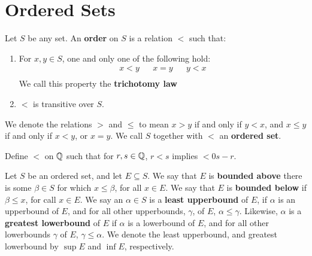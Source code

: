 
\section{Ordered Sets}

\begin{definition}
    Let $S$ be any set. An \textbf{order} on $S$ is a relation  $<$ such that:
        \begin{enumerate}[label=(\arabic*)]
            \item For $x,y \in S$, one and only one of the following hold:
                \begin{align*}
                    x<y && x=y && y<x \\		
                \end{align*}
            We call this property the \textbf{trichotomy law}

            \item $<$ is transitive over $S$.
        \end{enumerate}
    We denote the relations $>$ and $\leq$ to mean $x>y$ if and only if $y<x$, 
    and $x \leq y$ if and only if $x<y$, or $x=y$. We call $S$ together with  $<$ 
    an \textbf{ordered set}.
\end{definition}

\begin{example}
    Define $<$  on $\mathbb{Q}$ such that for $r,s \in \mathbb{Q}$, $r<s$ implies $<0s-r$.		
\end{example}

\begin{definition}
    Let $S$ be an ordered set, and let  $E \subseteq S$. We say that  $E$ is \textbf{bounded above} 
    there is some  $\beta \in S$ for which  $x \leq \beta$, for all $x \in E$. We say that $E$ 
    is  \textbf{bounded below} if  $\beta \leq x$, for call  $x \in E$. We say an $\alpha \in S$ is a 
    \textbf{least upperbound} of  $E$, if  $\alpha$ is an upperbound of  $E$, and for all 
    other upperbounds,  $\gamma$, of  $E$,  $\alpha \leq \gamma$. Likewise,  $\alpha$ is a \textbf{greatest 
    lowerbound}  of $E$ if  $\alpha$ is a lowerbound of  $E$, and for all other lowerbounds  
    $\gamma$ of  $E$,  $\gamma \leq \alpha$. We denote the least upperbound, and greatest lowerbound 
    by  $\sup{E}$ and  $\inf{E}$, respectively.
\end{definition}

